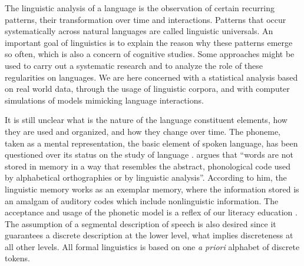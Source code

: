 
The linguistic analysis of a language is the observation of certain recurring patterns,
their transformation over time and interactions. 
Patterns that occur systematically across natural languages are called linguistic universals. 
An important goal of linguistics is to explain the reason why these patterns emerge so often,
which is also a concern of cognitive studies.
Some approaches might be used to carry out a systematic research and to analyze the role of 
these regularities on languages. We are here concerned with a statistical analysis based 
on real world data, through the usage of linguistic corpora, and with computer simulations
of models mimicking language interactions. 

It is still unclear what is the nature of the language constituent elements, how they are used and organized, and
how they change over time. The phoneme, taken as a mental representation, the basic element of spoken language, 
has been questioned over its status on the study of language \citep{port2007,port2005,port2006}.
\cite{port2007} argues that ``words are not stored in memory in a way that resembles the abstract, 
phonological code used by alphabetical orthographies or by linguistic analysis''. 
According to him, the linguistic memory works as an exemplar memory, where the information stored is an amalgam 
of auditory codes which include nonlinguistic information. The acceptance and usage of the phonetic model is 
a reflex of our literacy education \citep{port2007,coleman2002}. The assumption of a segmental description of 
speech is also desired since it guarantees a discrete description at the lower level, what implies discreteness 
at all other levels. All formal linguistics is based on one \textit{a priori} alphabet of discrete tokens.

